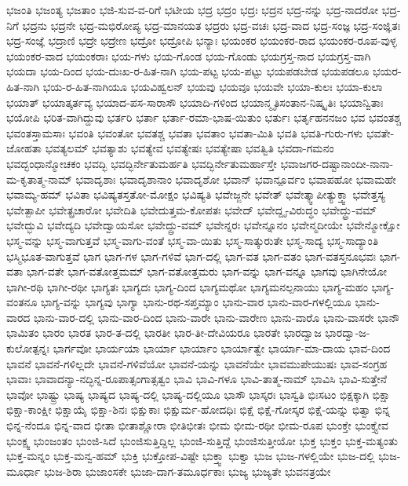 {ಭಜಂತಿ
ಭಜಂತ್ಯ
ಭಜತಾಂ
ಭಜಿ-ಸುವ-ವ-ರಿಗೆ
ಭಟೀಯ
ಭದ್ರ
ಭದ್ರಂ
ಭದ್ರಃ
ಭದ್ರನ
ಭದ್ರ-ನನ್ನು
ಭದ್ರ-ನಾದರೋ
ಭದ್ರ-ನಿಗೆ
ಭದ್ರನು
ಭದ್ರನೇ
ಭದ್ರ-ಮಭಿರೋಪ್ಯ
ಭದ್ರ-ಮಾನಯತ
ಭದ್ರರು
ಭದ್ರ-ವಚಃ
ಭದ್ರ-ವಾದ
ಭದ್ರ-ಸಂಜ್ಞ
ಭದ್ರ-ಸಂಜ್ಞಿತಃ
ಭದ್ರ-ಸಂಜ್ಞೆ
ಭದ್ರಾಣಿ
ಭದ್ರೇ
ಭದ್ರೇಣ
ಭದ್ರೋ
ಭದ್ರೋಪಿ
ಭನ್ಯಾಃ
ಭಯಂಕರ
ಭಯಂಕರ-ರಾದ
ಭಯಂಕರ-ರೂಪ-ವುಳ್ಳ
ಭಯಂಕರ-ವಾದ
ಭಯಂಕರಾಃ
ಭಯ-ಗಳು
ಭಯ-ಗೊಂಡ
ಭಯ-ಗೊಂಡು
ಭಯಗ್ರಸ್ತ-ನಾದ
ಭಯಗ್ರಸ್ತ-ವಾಗಿ
ಭಯದಾ
ಭಯ-ದಿಂದ
ಭಯ-ದುಃಖ-ರ-ಹಿತ-ನಾಗಿ
ಭಯ-ಪಟ್ಟ
ಭಯ-ಪಟ್ಟು
ಭಯಪಡಬೇಡ
ಭಯಪಡಲೂ
ಭಯರ-ಹಿತ-ನಾಗಿ
ಭಯ-ರ-ಹಿತ-ನಾಗಿಯೂ
ಭಯವಿಹ್ವಲನ್
ಭಯವು
ಭಯವೂ
ಭಯವೇ
ಭಯಾ-ಕುಲಃ
ಭಯಾ-ಕುಲಾ
ಭಯಾತ್
ಭಯಾತ್ಕರ್ತವ್ಯ
ಭಯಾದ-ಪಸ-ಸಾರಾಸೌ
ಭಯಾದಿ-ಗಳಿಂದ
ಭಯಾನ್ಮೃತಿಸಂತಾನ-ನಿಷ್ಕೃತಿಃ
ಭಯಾನ್ವಿತಾಃ
ಭಯೋಪಿ
ಭರಿತ-ವಾಗಿದ್ದುವು
ಭರ್ತರಿ
ಭರ್ತಾ
ಭರ್ತಾ-ರಮಾ-ಭಾಷ-ಯಿತುಂ
ಭರ್ತುಃ
ಭರ್ತೃಹನನಜಂ
ಭವ
ಭವಂತಶ್ಚ
ಭವಂತಸ್ತಾಮಸಾಃ
ಭವಂತಿ
ಭವಂತೋ
ಭವತಶ್ಚ
ಭವತಾ
ಭವತಾಂ
ಭವತಾ-ಮಿತಿ
ಭವತಿ
ಭವತಿ-ಗುರು-ಗಳು
ಭವತೇ-ಜೋಹತಾ
ಭವತ್ಯಲಮ್
ಭವತ್ಯಾಶು
ಭವತ್ಯೇವ
ಭವತ್ಯೇಷಃ
ಭವತ್ಯೇಷಾ
ಭವತ್ವಿತಿ
ಭವದಾ-ಗಮನಂ
ಭವದ್ಭಂಧಾನ್ಮೋಚಕಂ
ಭವದ್ಭಿ
ಭವದ್ಭಿರ್ನೇತುಮರ್ಹತಿ
ಭವದ್ಭಿರ್ನೇತುಮರ್ಹಾಸ್ತೇ
ಭವಾಜಗರ-ದಷ್ಟಾನಾಂದೀ-ನಾನಾ-ಮ-ಕೃತಾತ್ಮ-ನಾಮ್
ಭವಾದೃಶಾಃ
ಭವಾದೃಶಾನಾಂ
ಭವಾದೃಶೋ
ಭವಾನ್
ಭವಾನ್ಪೂರ್ವಂ
ಭವಾಪಹೋ
ಭವಾಮಹೇ
ಭವಾಮ್ಯ-ಹಮ್
ಭವಿತಾ
ಭವಿಷ್ಯತಸ್ತತೋ-ಮೋಕ್ಷಂ
ಭವಿಷ್ಯತಿ
ಭವೇಜ್ಜನೇ
ಭವೇತ್
ಭವೇತ್ಕ್ವಾಪೀತ್ಯುಕ್ತ್ವಾ
ಭವೇತ್ತಸ್ಯ
ಭವೇತ್ಪಾಪೀ
ಭವೇತ್ಪ್ರಚಾರೋ
ಭವೇದಿತಿ
ಭವೇದುತ್ತಮ-ಕೋಪತಃ
ಭವೇದ್
ಭವೇದ್ದೃ-ವಿರುದ್ಧಂ
ಭವೇದ್ಧ್ರು-ವಮ್
ಭವೇದ್ಭುವಿ
ಭವೇದ್ಯದಿ
ಭವೇದ್ವಾಯಸೋ
ಭವೇದ್ದ್ರು-ವಮ್
ಭವೇನ್ನರಃ
ಭವೇನ್ನೂನಂ
ಭವೇನ್ಮದೀಯೇ
ಭವೇನ್ಮೋಕ್ಷೋ
ಭಸ್ಮ-ವನ್ನು
ಭಸ್ಮ-ವಾಗುತ್ತವೆ
ಭಸ್ಮ-ವಾಗು-ವಂತೆ
ಭಸ್ಮ-ವಾ-ಯಿತು
ಭಸ್ಮ-ಸಾತ್ಕುರುತೇ
ಭಸ್ಮ-ಸಾದ್ಯ
ಭಸ್ಮ-ಸಾದ್ಯಾಂತಿ
ಭಸ್ಮಿಭೂತ-ವಾಗುತ್ತವೆ
ಭಾಗ
ಭಾಗ-ಗಳ
ಭಾಗ-ಗಳಿವೆ
ಭಾಗ-ದಲ್ಲಿ
ಭಾಗ-ವತ
ಭಾಗ-ವತಂ
ಭಾಗ-ವತಸ್ತನೂಭವಃ
ಭಾಗ-ವತಾ
ಭಾಗ-ವತೇ
ಭಾಗ-ವತೋತ್ತಮಮ್
ಭಾಗ-ವತೋತ್ತಮರು
ಭಾಗ-ವನ್ನು
ಭಾಗ-ವನ್ನೂ
ಭಾಗವು
ಭಾಗಿನೇಯೋ
ಭಾಗೀ-ರಥಿ
ಭಾಗೀ-ರಥೀ
ಭಾಗ್ಯತಃ
ಭಾಗ್ಯದಃ
ಭಾಗ್ಯ-ದಿಂದ
ಭಾಗ್ಯಮಥೋ
ಭಾಗ್ಯಮನಲ್ಪನಾಯು
ಭಾಗ್ಯ-ಮಹಂ
ಭಾಗ್ಯ-ವಂತನೂ
ಭಾಗ್ಯ-ವನ್ನು
ಭಾಗ್ಯವು
ಭಾಗ್ಯಾ
ಭಾನು-ರಥ-ಸಪ್ತಮ್ಯಾಂ
ಭಾನು-ವಾರ
ಭಾನು-ವಾರ-ಗಳಲ್ಲಿಯೂ
ಭಾನು-ವಾರದ
ಭಾನು-ವಾರ-ದಲ್ಲಿ
ಭಾನು-ವಾರ-ದಿಂದ
ಭಾನು-ವಾರೇ
ಭಾನು-ವಾರೇಣ
ಭಾನು-ವಾರೊ
ಭಾನು-ವಾಸರೇ
ಭಾನೌ
ಭಾಮಿತಂ
ಭಾರಂ
ಭಾರತ
ಭಾರ-ತ-ದಲ್ಲಿ
ಭಾರತೀ
ಭಾರ-ತೀ-ದೇವಿಯರೂ
ಭಾರತೇ
ಭಾರದ್ವಾಜ
ಭಾರದ್ವಾ-ಜ-ಕುಲೋತ್ಪನ್ನಃ
ಭಾರ್ಗವೋ
ಭಾರ್ಯಯಾ
ಭಾರ್ಯಾ
ಭಾರ್ಯಾಂ
ಭಾರ್ಯಾತ್ವೇ
ಭಾರ್ಯಾ-ಮಾ-ದಾಯ
ಭಾವ-ದಿಂದ
ಭಾವನೆ
ಭಾವನೆ-ಗಳಿಲ್ಲದೇ
ಭಾವನೆ-ಗಳಿವೆಯೋ
ಭಾವನೆ-ಯನ್ನು
ಭಾವನೆಯೇ
ಭಾವಮುಪೇಯುಷಃ
ಭಾವ-ಸಂಗ್ರಹ
ಭಾವಾಃ
ಭಾವಾದನ್ಯಾ-ನದ್ಭಿನ್ನ-ರೂಪಾತ್ಸಂಗಾತ್ಸತ್ವಂ
ಭಾವಿ
ಭಾವಿ-ಗಳೂ
ಭಾವಿ-ತಾತ್ಮ-ನಾಮ್
ಭಾವಿಸಿ
ಭಾವಿ-ಸುತ್ತೇನೆ
ಭಾವೋ
ಭಾಷ್ಟ್ರು
ಭಾಷ್ಯ
ಭಾಷ್ಯದ
ಭಾಷ್ಯ-ದಲ್ಲಿ
ಭಾಷ್ಯ-ದಲ್ಲಿಯೂ
ಭಾಸೌ
ಭಾಸ್ಕರಃ
ಭಾಸ್ವತಿ
ಭಿಃಸಟಂ
ಭಿಕ್ಷಕ್ಕಾಗಿ
ಭಿಕ್ಷಾ
ಭಿಕ್ಷಾ-ಕಾಂಕ್ಷೀ
ಭಿಕ್ಷಾಯೈ
ಭಿಕ್ಷಾ-ಶಿನಃ
ಭಿಕ್ಷುಕಾಃ
ಭಿಕ್ಷುರ್ಮ-ಹೋದಧಿಃ
ಭಿಕ್ಷೆ
ಭಿಕ್ಷೆ-ಗೋಸ್ಕರ
ಭಿಕ್ಷೆ-ಯನ್ನು
ಭಿತ್ವಾ
ಭಿನ್ನ
ಭಿನ್ನ-ನೆಂದೂ
ಭಿನ್ನ-ವಾದ
ಭೀತಾ
ಭೀತಾಶ್ಣೋರಾ
ಭೀತಿಭೀತಃ
ಭೀಮ
ಭೀಮ-ರಥೀ
ಭೀಮ-ರೂಪ
ಭುಂಕ್ತೇ
ಭುಂಕ್ತ್ಯೇವ
ಭುಂಕ್ಷ್ವ
ಭುಂಜಂತಂ
ಭುಂಜಿ-ಸಿದೆ
ಭುಂಜಿಸುತ್ತಿದ್ದಿಲ್ಲ
ಭುಂಜಿ-ಸುತ್ತಿದ್ದೆ
ಭುಂಜಿಸುತ್ತೀಯೋ
ಭುಕ್ತ
ಭುಕ್ತಂ
ಭುಕ್ತ-ಮತ್ಯಂತು
ಭುಕ್ತ-ಮನ್ನಂ
ಭುಕ್ತ-ಮನ್ವ-ಹಮ್
ಭುಕ್ತಿ
ಭುಕ್ತೋಪ-ವಿಷ್ಟೇ
ಭುಕ್ತ್ವಾ
ಭುಕ್ವಾ
ಭುಜ
ಭುಜ-ಗಳಲ್ಲಿಯೇ
ಭುಜ-ದಲ್ಲಿ
ಭುಜ-ಮೂರ್ಧಾ
ಭುಜ-ಶಿರಾ
ಭುಜಾಂಸಕೇ
ಭುಜಾ-ದಾಗ-ತಮೂರ್ಧಕಾಃ
ಭುಜ್ಯ
ಭುಜ್ಯತೇ
ಭುವನತ್ರಯೇ
}
